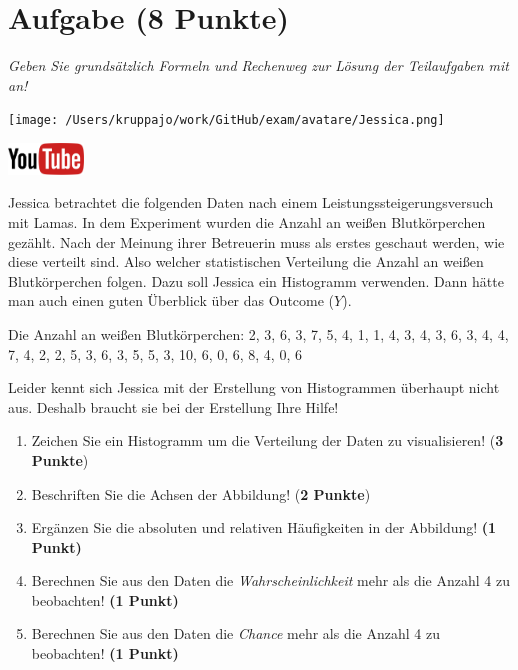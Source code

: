\documentclass[a4paper, 9pt]{scrartcl}\usepackage[]{graphicx}\usepackage[]{xcolor}
\begin{document}
\section{Aufgabe \hfill (8 Punkte)}

\textit{Geben Sie grundsätzlich Formeln und Rechenweg zur Lösung der Teilaufgaben mit an!} \\[1Ex]
 

 
\begin{minipage}[t]{0.5\textwidth}
\texttt{[image: /Users/kruppajo/work/GitHub/exam/avatare/Jessica.png]}
\end{minipage}
\begin{minipage}[t]{0.5\textwidth}
\hfill
\href{https://youtu.be/aXvxGC4YLqk}{\includegraphics[width = 2cm]{img/youtube}}\\[1Ex]
\end{minipage}
\vspace{1ex}



Jessica betrachtet die folgenden Daten nach einem Leistungssteigerungsversuch mit Lamas. In dem Experiment wurden die Anzahl an weißen Blutkörperchen gezählt. Nach der Meinung ihrer Betreuerin muss als erstes geschaut werden, wie diese verteilt sind. Also welcher statistischen Verteilung die Anzahl an weißen Blutkörperchen folgen. Dazu soll Jessica ein Histogramm verwenden. Dann hätte man auch einen guten Überblick über das Outcome ($Y$).

\begin{center}
Die Anzahl an weißen Blutkörperchen: 2, 3, 6, 3, 7, 5, 4, 1, 1, 4, 3, 4, 3, 6, 3, 4, 4, 7, 4, 2, 2, 5, 3, 6, 3, 5, 5, 3, 10, 6, 0, 6, 8, 4, 0, 6
\end{center}

Leider kennt sich Jessica mit der Erstellung von Histogrammen überhaupt nicht aus. Deshalb braucht sie bei der Erstellung Ihre Hilfe!

\begin{enumerate}
\item Zeichen Sie ein Histogramm um die Verteilung der Daten zu visualisieren! (\textbf{3 Punkte})
\item Beschriften Sie die Achsen der Abbildung! (\textbf{2 Punkte})
\item Ergänzen Sie die absoluten und relativen Häufigkeiten in der
  Abbildung! \textbf{(1 Punkt)}
\item Berechnen Sie aus den Daten die \textit{Wahrscheinlichkeit}
  mehr als die Anzahl 4 zu beobachten! \textbf{(1
    Punkt)}
\item Berechnen Sie aus den Daten die \textit{Chance} mehr
  als die Anzahl 4 zu beobachten! \textbf{(1 Punkt)}
\end{enumerate}
\end{document}
